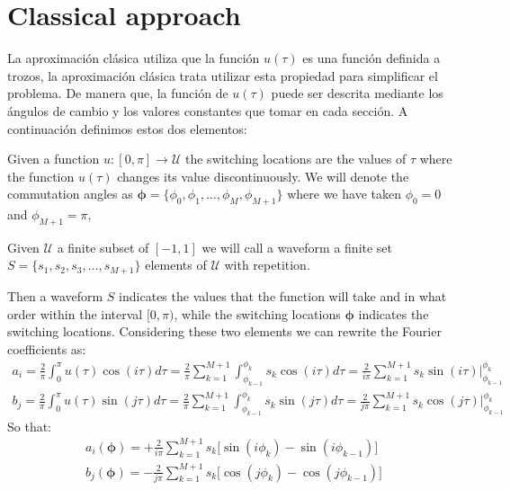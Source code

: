 \section{Classical approach}



La aproximación clásica utiliza que la función $u(\tau)$ es una función definida a trozos, la aproximación clásica trata utilizar esta propiedad para simplificar el problema. De manera que, la función de $u(\tau)$ puede ser descrita mediante los ángulos de cambio y los valores constantes que tomar en cada sección. A continuación definimos estos dos elementos: 

\begin{definition}
    Given a function $ u: [0, \pi] \rightarrow \mathcal{U} $ the switching locations are the values of $ \tau $ where the function $u(\tau)$ changes its value discontinuously. We will denote the commutation angles as $ \bm {\phi} = \{\phi_0, \phi_1, \dots, \phi_M, \phi_ {M + 1} \} $ where we have taken $ \phi_0 = 0 $ and $ \phi_ {M + 1} = \pi $,
\end{definition}

\begin{definition}[Waveform]
    Given $ \mathcal {U} $ a finite subset of $ [- 1,1] $ we will call a waveform a finite set $ S = \{s_1, s_2, s_3, \dots, s_ {M + 1} \} $ elements of  $ \mathcal {U} $ with repetition.
\end{definition}

Then a waveform $ S $ indicates the values that the function will take and in what order within the interval $ [0, \pi) $, while the switching locations $ \bm {\phi} $ indicates the switching locations. Considering these two elements we can rewrite the Fourier coefficients as:
\begin{gather}
    a_i = \frac{2}{\pi} \int_0^\pi u(\tau ) \cos(i \tau)d\tau  = \frac{2}{\pi} \sum_{k =  1}^{M+1} 
    \int_{\phi_{k-1}}^{\phi_{k}} s_k  \cos(i\tau)d\tau = \frac{2}{i\pi} \sum_{k=1}^{M+1} s_k \sin(i\tau) \Big|_{\phi_{k-1}}^{\phi_k} 
\end{gather}
\begin{gather}
    b_j = \frac{2}{\pi} \int_0^\pi u(\tau ) \sin(j \tau)d\tau =
    \frac{2}{\pi} \sum_{k =1}^{M+1} 
    \int_{\phi_{k-1}}^{\phi_{k}} s_k \sin(j\tau)d\tau = 
    \frac{2}{j\pi} \sum_{k=1}^{M+1} 
    s_k \cos(j\tau) \Big|_{\phi_{k-1}}^{\phi_k} 
\end{gather}
So that:
\begin{gather}
    a_i(\bm{\phi}) = +\frac{2}{i\pi}  \sum_{k=1}^{M+1} s_k \Big[ \sin(i\phi_k) -\sin(i\phi_{k-1})\Big] \\
    b_j(\bm{\phi}) = -\frac{2}{j\pi}  \sum_{k=1}^{M+1} s_k \Big[ \cos(j\phi_k) -\cos(j\phi_{k-1})\Big]
\end{gather}

